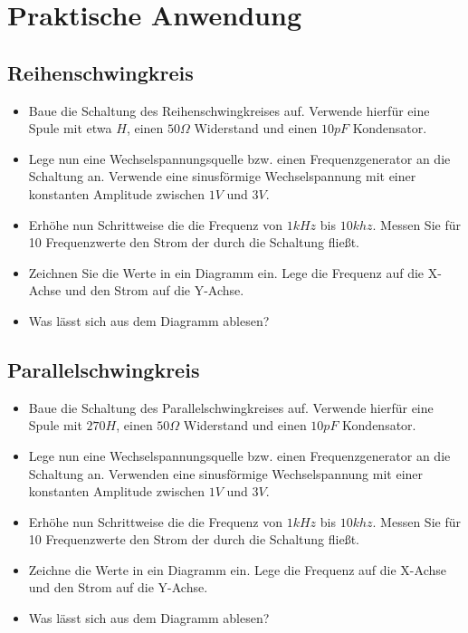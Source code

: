 \section*{Praktische Anwendung}

\subsection*{Reihenschwingkreis}

\begin{itemize}
\itemsep1pt\parskip0pt
\item Baue die Schaltung des Reihenschwingkreises auf. Verwende hierfür eine Spule mit etwa $H$, einen $50\Omega$ Widerstand und einen $10pF$ Kondensator. 
\item Lege nun eine Wechselspannungsquelle bzw. einen Frequenzgenerator an die Schaltung an. Verwende eine sinusförmige Wechselspannung mit einer konstanten Amplitude zwischen $1V$ und $3V$.
\item Erhöhe nun Schrittweise die die Frequenz von $1kHz$ bis $10khz$. Messen Sie für 10 Frequenzwerte den Strom der durch die Schaltung fließt.
\item Zeichnen Sie die Werte in ein Diagramm ein. Lege die Frequenz auf die X-Achse und den Strom auf die Y-Achse.
\item Was lässt sich aus dem Diagramm ablesen?
\end{itemize}


\subsection*{Parallelschwingkreis}

\begin{itemize}
\itemsep1pt\parskip0pt
\item Baue die Schaltung des Parallelschwingkreises auf. Verwende hierfür eine Spule mit $270H$, einen $50\Omega$ Widerstand und einen $10pF$ Kondensator. 
\item Lege nun eine Wechselspannungsquelle bzw. einen Frequenzgenerator an die Schaltung an. Verwenden eine sinusförmige Wechselspannung mit einer konstanten Amplitude zwischen $1V$ und $3V$.
\item Erhöhe nun Schrittweise die die Frequenz von $1kHz$ bis $10khz$. Messen Sie für 10 Frequenzwerte den Strom der durch die Schaltung fließt.
\item Zeichne die Werte in ein Diagramm ein. Lege die Frequenz auf die X-Achse und den Strom auf die Y-Achse.
\item Was lässt sich aus dem Diagramm ablesen?
\end{itemize}

